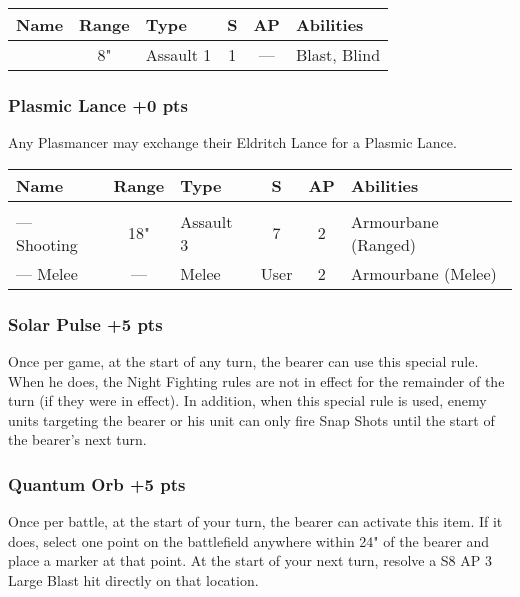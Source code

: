 \label{Gaze of Flame}
\noindent
\begin{NiceTabular}{L{115 pt} c C{40pt} *{2}{c} >{\raggedright\arraybackslash}p{240pt}}
	Name & Range & Type & S & AP & Abilities \\
	\hline
	 & 8" & Assault 1  & 1 & — & Blast, Blind \\
\end{NiceTabular}

\subsubsection[Plasmic Lance]{Plasmic Lance  \hrulefill +0 pts}

Any Plasmancer may exchange their Eldritch Lance for a Plasmic Lance.

\label{Plasmic Lance}
\noindent
\begin{NiceTabular}{L{115 pt} c C{40pt} *{2}{c} >{\raggedright\arraybackslash}p{240pt}}
	Name & Range & Type & S & AP & Abilities \\
	\hline
	 &  &  &  &  & \\
	— Shooting & 18" & Assault 3 & 7 & 2 & Armourbane (Ranged) \\
	— Melee & — & Melee & User & 2 & Armourbane (Melee) \\
\end{NiceTabular}

\subsubsection[Solar Pulse ]{Solar Pulse  \hrulefill +5 pts}

Once per game, at the start of any turn, the bearer can use this special rule. When he does, the Night Fighting rules are not in effect for the remainder of the turn (if they were in effect). In addition, when this special rule is used, enemy units targeting the bearer or his unit can only fire Snap Shots until the start of the bearer’s next turn.

\subsubsection[Quantum Orb ]{Quantum Orb  \hrulefill +5 pts}

Once per battle, at the start of your turn, the bearer can activate this item. If it does, select one point on the battlefield anywhere within 24" of the bearer and place a marker at that point. At the start of your next turn, resolve a S8 AP 3 Large Blast hit directly on that location. %


